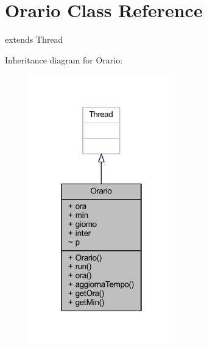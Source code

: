 \hypertarget{classa_1_1survival_1_1game_1_1_orario}{}\section{Orario Class Reference}
\label{classa_1_1survival_1_1game_1_1_orario}


extends Thread  




Inheritance diagram for Orario\+:
\nopagebreak
\begin{figure}[H]
\begin{center}
\leavevmode
\includegraphics[width=178pt]{classa_1_1survival_1_1game_1_1_orario__inherit__graph}
\end{center}
\end{figure}


